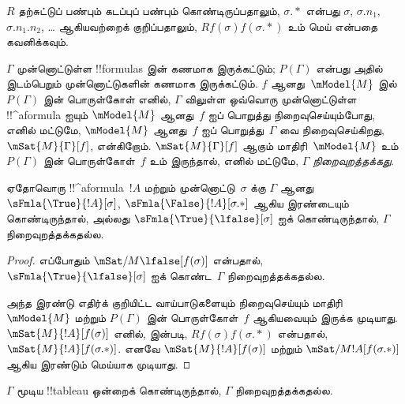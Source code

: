 \documentclass[../../../include/open-logic-section]{subfiles}
\begin{document}
$R$ தற்சுட்டுப் பண்பும் கடப்புப் பண்பும் கொண்டிருப்பதாலும்,
$\sigma.{*}$ என்பது $\sigma$, $\sigma.n_1$, $\sigma.n_1.n_2$, \dots
ஆகியவற்றைக் குறிப்பதாலும், $Rf(\sigma)f(\sigma.{*})$ உம் மெய் என்பதை
கவனிக்கவும்.

\begin{defn}
  $\Gamma$ முன்னொட்டுள்ள !!{formula}s இன் கணமாக இருக்கட்டும்;
  $P(\Gamma)$ என்பது அதில் இடம்பெறும் முன்னொட்டுகளின் கணமாக இருக்கட்டும்.
  $f$ ஆனது~$\mModel{M}$ இல்~$P(\Gamma)$ இன் பொருள்கோள் எனில்,
  $\Gamma$ விலுள்ள ஒவ்வொரு முன்னொட்டுள்ள !!^a{formula} ஐயும்
  $\mModel{M}$ ஆனது~$f$ ஐப் பொறுத்து நிறைவுசெய்யும்போது, எனில் மட்டுமே,
  $\mModel{M}$ ஆனது~$f$ ஐப் பொறுத்து~$\Gamma$ வை நிறைவுசெய்கிறது,
  $\mSat{M}{\Gamma}[f]$, என்கிறோம். $\mSat{M}{\Gamma}[f]$ ஆகும்
  மாதிரி~$\mModel{M}$ உம் $P(\Gamma)$ இன் பொருள்கோள்~$f$ உம் இருந்தால்,
  எனில் மட்டுமே, $\Gamma$ \emph{நிறைவுறத்தக்கது}.
\end{defn}

\begin{prop}
  ஏதோவொரு !!^a{formula}~$!A$ மற்றும் முன்னொட்டு~$\sigma$ க்கு $\Gamma$
  ஆனது $\sFmla{\True}{!A}[\sigma]$, $\sFmla{\False}{!A}[\sigma.{*}]$
  ஆகிய இரண்டையும் கொண்டிருந்தால், அல்லது
  $\sFmla{\True}{\lfalse}[\sigma]$ ஐக் கொண்டிருந்தால், $\Gamma$
  நிறைவுறத்தக்கதல்ல.
\end{prop}

\begin{proof}
  எப்போதும் $\mSat/{M}{\lfalse}[f(\sigma)]$ என்பதால்,
  $\sFmla{\True}{\lfalse}[\sigma]$ ஐக் கொண்ட~$\Gamma$
  நிறைவுறத்தக்கதல்ல.

  அந்த இரண்டு எதிர்க் குறியிட்ட வாய்பாடுகளையும் நிறைவுசெய்யும்
  மாதிரி~$\mModel{M}$ மற்றும் $P(\Gamma)$ இன் பொருள்கோள்~$f$ ஆகியவையும்
  இருக்க முடியாது. $\mSat{M}{!A}[f(\sigma)]$ எனில்,
   இன்படி,
  $Rf(\sigma)f(\sigma.{*})$ என்பதால்,
  $\mSat{M}{!A}[f(\sigma.{*})]$. எனவே
  $\mSat{M}{!A}[f(\sigma)]$ மற்றும்
  $\mSat/{M}{!A}[f(\sigma.{*})]$ ஆகிய இரண்டும் மெய்யாக முடியாது.
\end{proof}

\begin{thm}[சரித்தன்மை]
  $\Gamma$ மூடிய !!{tableau} ஒன்றைக் கொண்டிருந்தால், $\Gamma$
  நிறைவுறத்தக்கதல்ல.
\end{thm}
\end{document}
